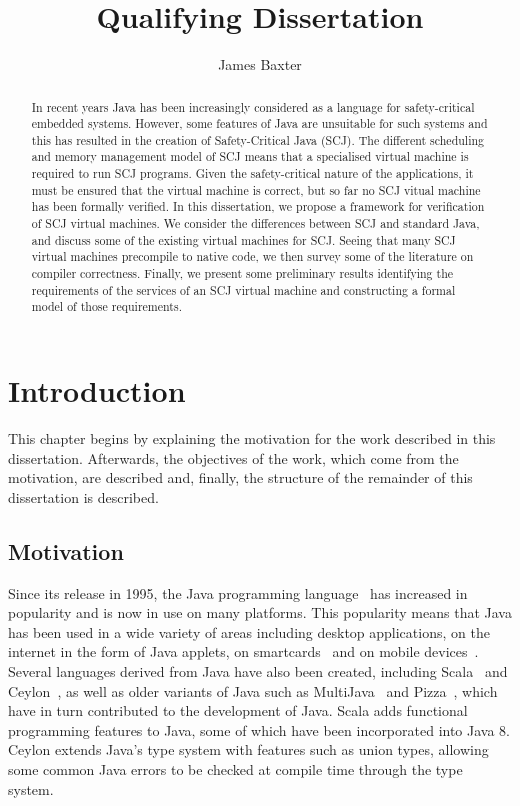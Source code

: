 \documentclass[a4paper,10pt]{report}
\title{Qualifying Dissertation}
\author{James Baxter}
\date{}
\begin{document}
\maketitle

\begin{abstract}
  In recent years Java has been increasingly considered as a language for
  safety-critical embedded systems.  However, some features of Java are
  unsuitable for such systems and this has resulted in the creation of
  Safety-Critical Java (SCJ).  The different scheduling and memory management
  model of SCJ means that a specialised virtual machine is required to run SCJ
  programs.  Given the safety-critical nature of the applications, it must be
  ensured that the virtual machine is correct, but so far no SCJ vitual machine
  has been formally verified.  In this dissertation, we propose a framework for
  verification of SCJ virtual machines.  We consider the differences between SCJ
  and standard Java, and discuss some of the existing virtual machines for SCJ.
  Seeing that many SCJ virtual machines precompile to native code, we then
  survey some of the literature on compiler correctness.  Finally, we present
  some preliminary results identifying the requirements of the services of an
  SCJ virtual machine and constructing a formal model of those requirements.
\end{abstract}

\tableofcontents

\chapter{Introduction}

This chapter begins by explaining the motivation for the work described in this
dissertation. Afterwards, the objectives of the work, which come from the
motivation, are described and, finally, the structure of the remainder of this
dissertation is described.

\section{Motivation}

Since its release in 1995, the Java programming language~\cite{gosling2013} has
increased in popularity and is now in use on many platforms.  This popularity
means that Java has been used in a wide variety of areas including desktop
applications, on the internet in the form of Java applets, on
smartcards~\cite{chen2000} and on mobile devices~\cite{oracle2014}.  Several
languages derived from Java have also been created, including
Scala~\cite{lausanne2015} and Ceylon~\cite{redhat2015}, as well as older
variants of Java such as MultiJava~\cite{clifton2006} and
Pizza~\cite{odersky1997}, which have in turn contributed to the development of
Java. Scala adds functional programming features to Java, some of which have
been incorporated into Java 8. Ceylon extends Java's type system with features
such as union types, allowing some common Java errors to be checked at compile
time through the type system.
\end{document}

